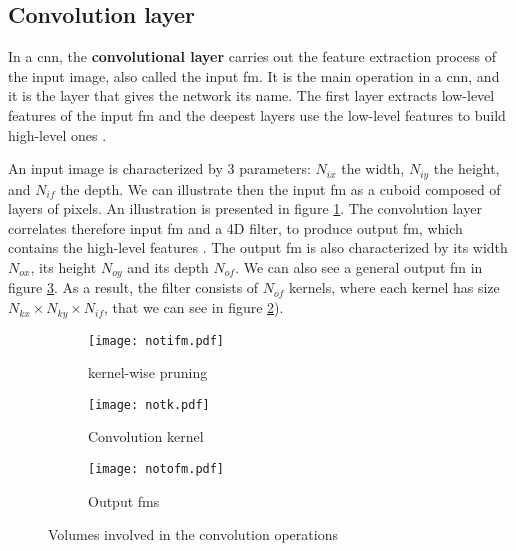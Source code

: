 \subsection{Convolution layer} \label{subs:2dconv}
In a \acrshort{cnn}, the \textbf{convolutional layer} carries out the feature extraction process of the input image, also called the input \acrfull{fm}. It is the main operation in a \acrshort{cnn}, and it is the layer that gives the network its name. The first layer extracts low-level features of the input \acrshort{fm} and the deepest layers use the low-level features to build high-level ones \cite{goodfellow_deep_2016}.

An input image is characterized by 3 parameters: \textbf{$N_{ix}$} the width, \textbf{$N_{iy}$} the height, and \textbf{$N_{if}$} the depth. We can illustrate then the input \acrshort{fm} as a cuboid composed of layers of pixels. An illustration is presented in figure \ref{fig:notation:ifm}.
The convolution layer correlates therefore input \acrshort{fm} and a 4D filter, to produce output \acrshort{fm}, which contains the high-level features \cite{zhao_towards_2018}. The output \acrshort{fm} is also characterized by its width $N_{ox}$, its height $N_{oy}$ and its depth $N_{of}$. We can also see a general output \acrshort{fm} in figure \ref{fig:notation:ofm}. As a result, the filter consists of $N_{of}$ kernels, where each kernel has size $N_{kx} \times N_{ky} \times N_{if}$, that we can see in figure \ref{fig:notation:k}).
%
\begin{figure}
    \centering
    \begin{subfigure}{.32\textwidth}
    \centering
    \texttt{[image: notifm.pdf]}
    \caption{kernel-wise pruning}
    \label{fig:notation:ifm}
    \end{subfigure}
    \begin{subfigure}{.32\textwidth}
    \centering
    \texttt{[image: notk.pdf]}
    \caption{Convolution kernel}
    \label{fig:notation:k}
    \end{subfigure}
    \begin{subfigure}{.32\textwidth}
    \centering
    \texttt{[image: notofm.pdf]}
    \caption{Output \acrshort{fm}s}
    \label{fig:notation:ofm}
    \end{subfigure}
    \caption{Volumes involved in the convolution operations}
    \label{fig:notconv}
\end{figure}

